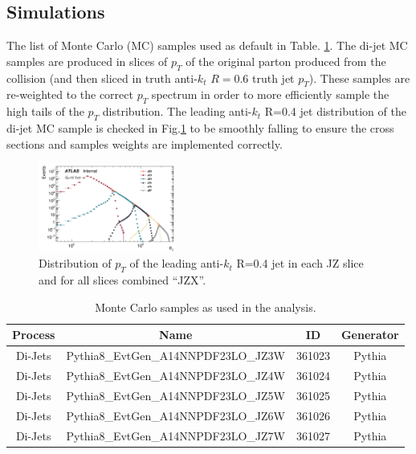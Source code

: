 \subsection{Simulations}

The list of Monte Carlo (MC) samples used as default in Table. \ref{tab:mc_samples1}. The di-jet MC samples are produced in slices of $p_{T}$ of the original parton produced from the collision (and then sliced in truth anti-$k_t$ $R=0.6$ truth jet $p_T$).  These samples are re-weighted to the correct $p_{T}$ spectrum in order to more efficiently sample the high tails of the $p_{T}$ distribution. The leading anti-$k_t$ R=0.4 jet distribution of the di-jet MC sample is checked in Fig.\ref{fig:gbb-leadAkt4} to be smoothly falling to ensure the cross sections and samples weights are implemented correctly.

\begin{figure}[htbp]
  \centering
 \includegraphics[width=0.4\textwidth]{figures/gbb/LeadJetCheck.png}
\caption{Distribution of $p_T$ of the leading anti-$k_t$ R=0.4 jet in each JZ slice and for all slices combined ``JZX''.}
  \label{fig:gbb-leadAkt4}
\end{figure}


\begin{table}[htpb]
\centering
\begin{tabular}{cccc}
Process & Name & ID & Generator \\
\hline 
\hline
Di-Jets & Pythia8\_EvtGen\_A14NNPDF23LO\_JZ3W & 361023 & Pythia  \\
Di-Jets & Pythia8\_EvtGen\_A14NNPDF23LO\_JZ4W & 361024 & Pythia  \\
Di-Jets & Pythia8\_EvtGen\_A14NNPDF23LO\_JZ5W & 361025 & Pythia  \\
Di-Jets & Pythia8\_EvtGen\_A14NNPDF23LO\_JZ6W & 361026 & Pythia  \\
Di-Jets & Pythia8\_EvtGen\_A14NNPDF23LO\_JZ7W & 361027 & Pythia  \\
\hline
\hline
\end{tabular}
\caption{Monte Carlo samples as used in the analysis. }
\label{tab:mc_samples1}
\end{table}


